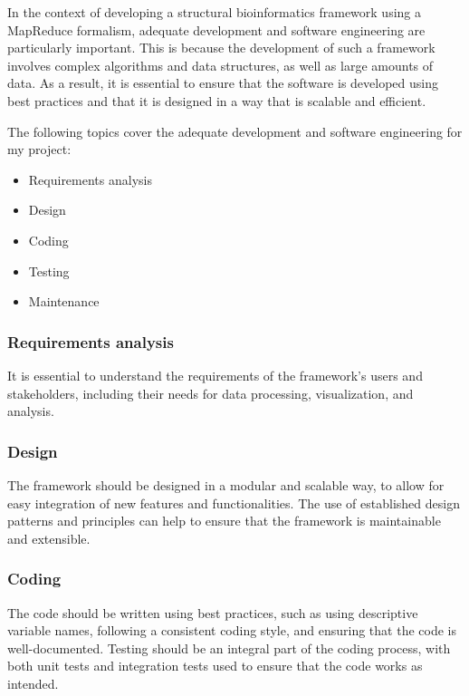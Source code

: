 \documentclass[]{final_report}
\begin{document}
In the context of developing a structural bioinformatics framework using a MapReduce formalism, adequate development and software engineering are particularly important. This is because the development of such a framework involves complex algorithms and data structures, as well as large amounts of data. As a result, it is essential to ensure that the software is developed using best practices and that it is designed in a way that is scalable and efficient.

The following topics cover the adequate development and software engineering for my project:

\begin{itemize}
    \item Requirements analysis
    \item Design
    \item Coding
    \item Testing
    \item Maintenance
\end{itemize}

\subsubsection{Requirements analysis}

It is essential to understand the requirements of the framework's users and stakeholders, including their needs for data processing, visualization, and analysis.

\subsubsection{Design}

The framework should be designed in a modular and scalable way, to allow for easy integration of new features and functionalities. The use of established design patterns and principles can help to ensure that the framework is maintainable and extensible.

\subsubsection{Coding}

The code should be written using best practices, such as using descriptive variable names, following a consistent coding style, and ensuring that the code is well-documented. Testing should be an integral part of the coding process, with both unit tests and integration tests used to ensure that the code works as intended.
\end{document}
